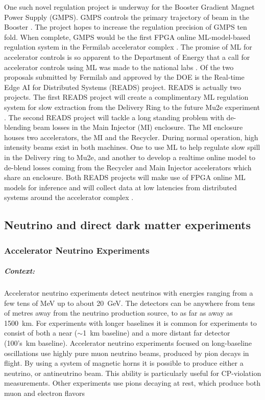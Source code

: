             One such novel regulation project is underway for the Booster Gradient Magnet Power Supply (GMPS). GMPS controls the primary trajectory of beam in the Booster \cite{operations_booster_rookie_book}. The project hopes to increase the regulation precision of GMPS ten fold. When complete, GMPS would be the first FPGA online ML-model-based regulation system in the Fermilab accelerator complex \cite{john2021realtime}. The promise of ML for accelerator controls is so apparent to the Department of Energy that a call for accelerator controls using ML was made to the national labs \cite{doe_foa_lab_20-2261}. Of the two proposals submitted by Fermilab and approved by the DOE is the Real-time Edge AI for Distributed Systems (READS) project. READS is actually two projects. The first READS project will create a complimentary ML regulation system for slow extraction from the Delivery Ring to the future Mu2e experiment \cite{bartoszek2015mu2e}. The second READS project will tackle a long standing problem with de-blending beam losses in the Main Injector (MI) enclosure. The MI enclosure houses two accelerators, the MI and the Recycler. During normal operation, high intensity beams exist in both machines. One to use ML to help regulate slow spill in the Delivery ring to Mu2e, and another to develop a realtime online model to de-blend losses coming from the Recycler and Main Injector accelerators which share an enclosure. Both READS projects will make use of FPGA online ML models for inference and will collect data at low latencies from distributed systems around the accelerator complex \cite{seiya2021accelerator}.

\subsection{Neutrino and direct dark matter experiments}
\subsubsection{Accelerator Neutrino Experiments}\label{sec:nuaccel}

\subparagraph*{Context:} Accelerator neutrino experiments detect neutrinos with energies ranging from a few tens of MeV up to about 20~GeV. The detectors can be anywhere from tens of metres away from the neutrino production source, to as far as away as 1500~km. For experiments with longer baselines it is common for experiments to consist of both a near ($\sim$1~km baseline) and a more distant far detector (100's~km baseline). Accelerator neutrino experiments focused on long-baseline oscillations use highly pure muon neutrino beams, produced by pion decays in flight. By using a system of magnetic horns it is possible to produce either a neutrino, or antineutrino beam. This ability is particularly useful for CP-violation measurements.   Other experiments use pions decaying at rest, which produce both muon and electron flavors
    
